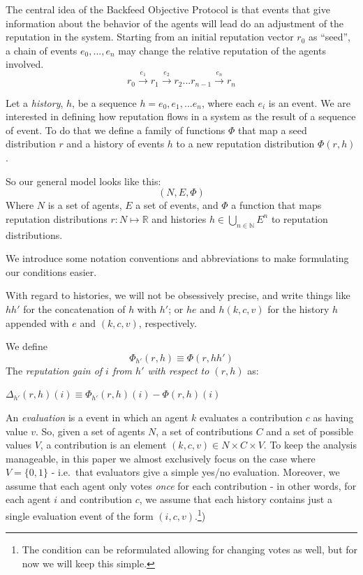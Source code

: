 \documentclass{article}
\newcommand{\flow}{\Phi}
\begin{document}
The central idea of the Backfeed Objective Protocol is that events  that give information about the behavior of the agents  will lead do an adjustment of the reputation in the system. 
Starting from an initial reputation vector $r_0$ as ``seed'', a chain of events $e_0, ..., e_n$ may change the relative reputation of the agents involved. 
\begin{equation}
r_0 \xrightarrow{e_1} r_1 \xrightarrow{e_2} r_2 ... r_{n-1} \xrightarrow{e_n} r_n
\end{equation}

Let a {\em history}, $h$, be a sequence  $h = e_0, e_1, ...  e_n$, where each $e_i$ is an event.
We are interested in defining how reputation flows in a system as the result of a sequence of event.
To do that we define a family of functions $\flow$ that map a seed distribution $r$ and a history of events $h$ to a new reputation distribution $\flow(r, h)$. 

So our general model looks like this:
\begin{equation}
(N, E, \flow)
\end{equation}
Where $N$ is a set of agents, $E$ a set of events, and $\flow$ a function that maps reputation distributions $r: N \mapsto\mathbb{R}$ and histories $h \in \bigcup_{n\in\mathbb{N}} E^n$ to reputation distributions. 

We introduce some notation conventions and abbreviations to make formulating our conditions easier.

With regard to histories, we will not be obsessively precise, and write things like $hh'$ for the concatenation of $h$ with $h'$; or $he$ and $h(k,c,v)$ for the history $h$ appended with $e$ and $(k,c,v)$, respectively. 

We define 
\begin{equation}
\flow_{h'}(r, h) \equiv \flow(r, hh')
\end{equation}
The {\em reputation gain of $i$ from $h'$ with respect to $(r, h)$} as:
\begin{center}
 $ \Delta_{h'}(r, h)(i) \equiv \flow_{h'}(r, h)(i) - \flow(r, h)(i)$
\end{center}
An {\em evaluation} is a event in which an agent $k$ evaluates a contribution $c$ as having value $v$.
So, given a set of agents $N$, a set of contributions $C$ and a set of possible values $V$, a contribution is an element $(k,c,v) \in N \times C \times V$.
To keep the analysis manageable, in this paper we almost exclusively focus on the case where $V= \{0, 1\}$ - i.e.\ that evaluators give a simple yes/no evaluation.
Moreover, we assume that each agent only votes {\em once} for each contribution - in other words, for each agent $i$ and contribution $c$, we assume that each history contains just a single evaluation event of the form $(i, c, v)$.\footnote{The condition can be reformulated allowing for changing votes as well, but for now we will keep this simple.})
 
\end{document}
